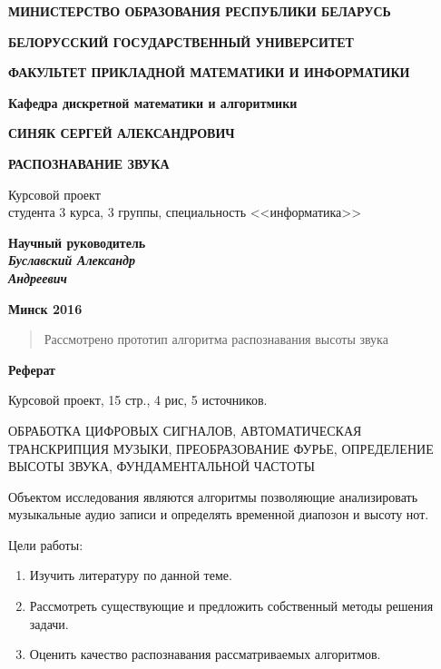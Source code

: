 \documentclass[oneside, final, 14pt]{extarticle}
\begin{document}
\begin{titlepage}


\centerline{\bf МИНИСТЕРСТВО ОБРАЗОВАНИЯ РЕСПУБЛИКИ БЕЛАРУСЬ}
\bigskip
\bigskip
\centerline{\bf БЕЛОРУССКИЙ ГОСУДАРСТВЕННЫЙ УНИВЕРСИТЕТ}
\bigskip
\bigskip
\centerline{\bf ФАКУЛЬТЕТ ПРИКЛАДНОЙ МАТЕМАТИКИ И ИНФОРМАТИКИ}
\bigskip
\bigskip
\centerline{\bf Кафедра дискретной математики и алгоритмики}
\vfill
\vfill
\vfill
\centerline{\bf СИНЯК СЕРГЕЙ АЛЕКСАНДРОВИЧ}
\bigskip
\bigskip
\centerline{\large \bf РАСПОЗНАВАНИЕ ЗВУКА}
\vfill
\begin{centering}
  {
  Курсовой проект \\
  студента 3 курса, 3 группы, специальность <<информатика>> \\}
\end{centering}
\vfill
\vfill
\hfill
\begin{minipage}{0.35\textwidth}
  {\bf Научный руководитель \\
  {\small{\it Буславский Александр \\ Андреевич}}}
\end{minipage}
\vfill
\vfill
\centerline{\large \bf Минск 2016}

\restoregeometry

\end{titlepage}

\begin{abstract}
  Рассмотрено прототип алгоритма распознавания высоты звука
\end{abstract}

\setcounter{page}{2}

\cleardoublepage

\centerline{\bf Реферат}

Курсовой проект, 15 стр., 4 рис, 5 источников.

ОБРАБОТКА ЦИФРОВЫХ СИГНАЛОВ, АВТОМАТИЧЕСКАЯ ТРАНСКРИПЦИЯ МУЗЫКИ,
ПРЕОБРАЗОВАНИЕ ФУРЬЕ, ОПРЕДЕЛЕНИЕ ВЫСОТЫ ЗВУКА, ФУНДАМЕНТАЛЬНОЙ
ЧАСТОТЫ

Объектом исследования являются алгоритмы позволяющие анализировать
музыкальные аудио записи и определять временной диапозон и высоту
нот.

Цели работы:
\begin{enumerate}
  \item Изучить литературу по данной теме.
  \item Рассмотреть существующие и предложить собственный методы решения
  задачи.
  \item Оценить качество распознавания рассматриваемых алгоритмов.
\end{enumerate}
\end{document}
